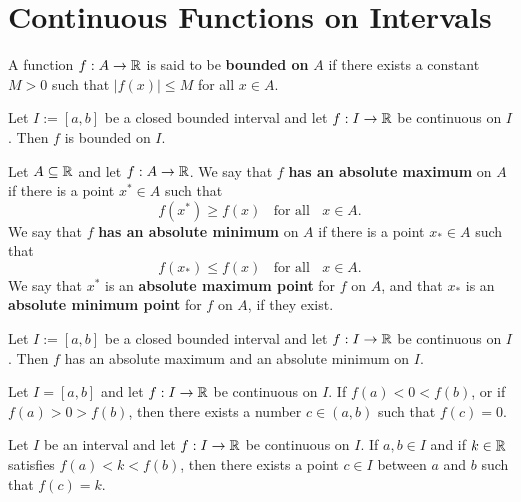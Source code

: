 \section{Continuous Functions on Intervals}

\begin{definition}
	A function $f:A \rightarrow \mathbb{R}$ is said to be \textbf{bounded on} $A$ if there exists a constant $M > 0$ such that $|f(x)| \leq M$ for all $x \in A$.
\end{definition}

\begin{theorem}
	Let $I:=[a,b]$ be a closed bounded interval and let $f: I \rightarrow \mathbb{R}$ be continuous on $I$. Then $f$ is bounded on $I$.
\end{theorem}

\begin{definition}
	Let $A \subseteq \mathbb{R}$ and let $f:A \rightarrow \mathbb{R}$. We say that $f$ \textbf{has an absolute maximum} on $A$ if there is a point $x^* \in A$ such that
	\[f(x^*) \geq f(x)\ \ \ \ \text{for all}\ \ \ \ x \in A.\]
	We say that $f$ \textbf{has an absolute minimum} on $A$ if there is a point $x_* \in A$ such that
	\[f(x_*) \leq f(x)\ \ \ \ \text{for all}\ \ \ \ x \in A.\]
	We say that $x^*$ is an \textbf{absolute maximum point} for $f$ on $A$, and that $x_*$ is an \textbf{absolute minimum point} for $f$ on $A$, if they exist.
\end{definition}

\begin{theorem}
	Let $I := [a,b]$ be a closed bounded interval and let $f: I \rightarrow \mathbb{R}$ be continuous on $I$. Then $f$ has an absolute maximum and an absolute minimum on $I$.
\end{theorem}

\begin{theorem}
	Let $I=[a,b]$ and let $f:I \rightarrow \mathbb{R}$ be continuous on $I$. If $f(a) < 0 < f(b)$, or if $f(a) > 0 > f(b)$, then there exists a number $c \in (a,b)$ such that $f(c)=0$.
\end{theorem}

\begin{theorem}
	Let $I$ be an interval and let $f:I \rightarrow \mathbb{R}$ be continuous on $I$. If $a,b \in I$ and if $k \in \mathbb{R}$ satisfies $f(a) < k<f(b)$, then there exists a point $c \in I$ between $a$ and $b$ such that $f(c) = k$.
\end{theorem}

